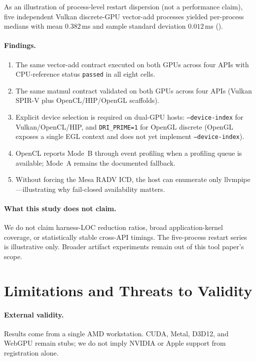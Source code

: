 \documentclass[11pt,a4paper]{article}
\begin{document}
As an illustration of process-level restart dispersion (not a performance
claim), five independent Vulkan discrete-GPU vector-add processes yielded
per-process medians with mean $0.382$\,ms and sample standard deviation
$0.012$\,ms ().

\paragraph{Findings.}
\begin{enumerate}
  \item The same vector-add contract executed on both GPUs across four APIs
        with CPU-reference status \texttt{passed} in all eight cells.
  \item The same matmul contract validated on both GPUs across four APIs
        (Vulkan SPIR-V plus OpenCL/HIP/OpenGL scaffolds).
  \item Explicit device selection is required on dual-GPU hosts:
        \texttt{--device-index} for Vulkan/OpenCL/HIP, and
        \texttt{DRI\_PRIME=1} for OpenGL discrete (OpenGL exposes a single
        EGL context and does not yet implement \texttt{--device-index}).
  \item OpenCL reports Mode~B through event profiling when a profiling
        queue is available; Mode~A remains the documented fallback.
  \item Without forcing the Mesa RADV ICD, the host can enumerate only
        llvmpipe---illustrating why fail-closed availability matters.
\end{enumerate}

\paragraph{What this study does not claim.}
We do not claim harness-LOC reduction ratios, broad application-kernel
coverage, or statistically stable cross-API timings. The five-process
restart series is illustrative only. Broader artifact experiments remain
out of this tool paper's scope.

\section{Limitations and Threats to Validity}
\label{sec:limits}

\paragraph{External validity.}
Results come from a single AMD workstation. CUDA, Metal, D3D12, and WebGPU
remain stubs; we do not imply NVIDIA or Apple support from registration alone.
\end{document}
